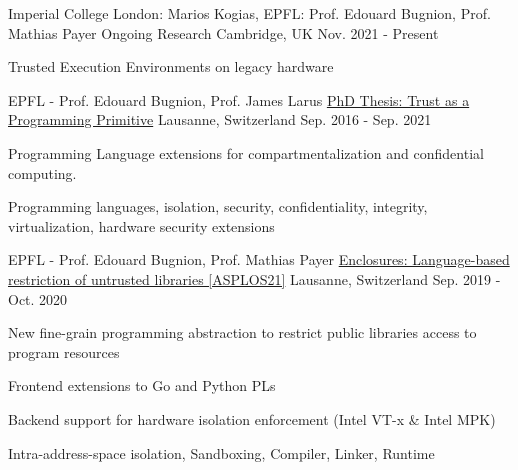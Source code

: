 \begin{cventries}

\cventry
{Imperial College London: Marios Kogias, EPFL: Prof. Edouard Bugnion, Prof. Mathias Payer}
{Ongoing Research}
{Cambridge, UK}
{Nov. 2021 - Present}
{ %
	\begin{cvitems}
  \item{Trusted Execution Environments on legacy hardware}
	\end{cvitems}
}



\cventry
{EPFL - Prof. Edouard Bugnion, Prof. James Larus}
  {\href{https://infoscience.epfl.ch/record/289120}{PhD Thesis: Trust as a Programming Primitive}}
{Lausanne, Switzerland}
{Sep. 2016  - Sep. 2021}
{
	\begin{cvitems}
  \item{Programming Language extensions for compartmentalization and confidential computing.}
  \item{Programming languages, isolation, security, confidentiality, integrity, virtualization, hardware security extensions}
	\end{cvitems}
}


\cventry
{EPFL - Prof. Edouard Bugnion, Prof. Mathias Payer}
  {\href{https://hexhive.epfl.ch/publications/files/21ASPLOS.pdf}{Enclosures: Language-based restriction of untrusted libraries [ASPLOS21]}}
{Lausanne, Switzerland}
{Sep. 2019  - Oct. 2020}
{
	\begin{cvitems}
  \item{New fine-grain programming abstraction to restrict public libraries access to program resources}
  \item{Frontend extensions to Go and Python PLs}
  \item{Backend support for hardware isolation enforcement (Intel VT-x \& Intel MPK)}
  \item{Intra-address-space isolation, Sandboxing, Compiler, Linker, Runtime}
	\end{cvitems}
}


\end{cventries}
